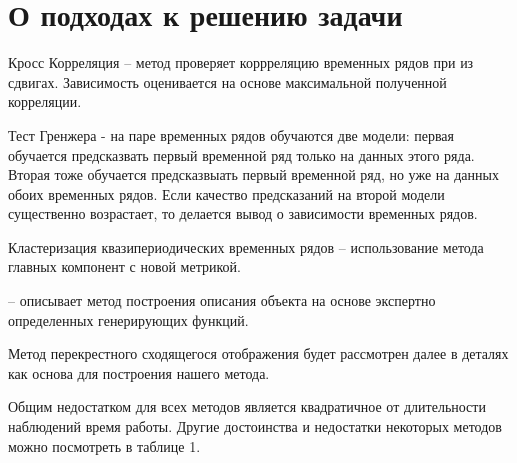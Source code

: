 \documentclass[12pt, twoside]{article}
\begin{document}
\section{О подходах к решению задачи}	
	
	Кросс Корреляция -- метод проверяет коррреляцию временных рядов при из сдвигах. Зависимость оценивается на основе максимальной полученной корреляции.
	
	Тест Гренжера \cite{Granger1980} - на паре временных рядов обучаются две модели: первая обучается предсказвать первый временной ряд  только на данных этого ряда. Вторая тоже обучается предсказвыать первый временной ряд, но уже на данных обоих временных рядов. Если качество предсказаний на второй модели существенно возрастает, то делается вывод о зависимости временных рядов.
	
	 Кластеризация квазипериодических временных рядов \cite{A.V.Grabovoy2018} -- использование метода главных компонент с новой метрикой. 
	 
	 \cite{Kwapisz2010} -- описывает метод построения описания объекта на основе экспертно определенных генерирующих функций.
	
	Метод перекрестного сходящегося отображения \cite{McCracken2014} будет рассмотрен далее в деталях как основа для построения нашего метода.
	
	Общим недостатком для всех методов является квадратичное от длительности наблюдений время работы. Другие достоинства и недостатки некоторых методов можно посмотреть в таблице 1.
	
\newpage
\end{document}
